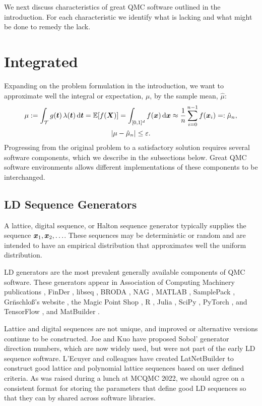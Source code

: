 \documentclass[graybox]{svmult}
\begin{document}
We next discuss characteristics of great QMC software outlined in the introduction.  For each characteristic we identify what is lacking and what might be done to remedy the lack.

\section{Integrated} \label{CDHS_sec:integrated}

Expanding on the problem formulation in the introduction, we want to approximate well the integral or expectation, $\mu$, by the sample mean, $\hat{\mu}$:
\begin{gather}
\label{eq:cubSummary}
	\mu : = \int_\calT g(\bst) \, \lambda(\bst) \, \D \bst  = \bbE[f(\bsX)] = \int_{[0,1]^d} f(\bsx)  \, \D \bsx \approx \frac 1n \sum_{i=0}^{n-1} f(\bsx_i) =: \hat{\mu}_n, \\
 \label{CDHS_eq:error_tol}
 \abs{\mu - \hat{\mu}_n} \le \varepsilon.
\end{gather}
Progressing from the original problem to a satisfactory solution requires several software components, which we describe in the subsections below.  Great QMC software environments allows different implementations of these components to be interchanged.

\subsection{LD Sequence Generators} A lattice, digital sequence, or Halton sequence generator typically supplies the sequence ${\boldsymbol{x}}_1, {\boldsymbol{x}}_2, \ldots$.  These sequences may be deterministic or random and are intended to have an empirical distribution that approximates well the uniform distribution.

LD generators are the most prevalent generally available components of QMC software.  These generators appear in Association of Computing Machinery  publications \cite{BraFox88,BraFoxNie92,HonHic00a}, FinDer \cite{PasTra95,FinDer}, libseq \cite{FriKel02,FriKelweb}, BRODA \cite{BRODA20a}, NAG \cite{NAG27}, MATLAB \cite{MAT9.13}, SamplePack \cite{SamplePack}, Gr\"nschlo{\ss}'s website \cite{GruWeb}, the Magic Point Shop \cite{NuyWeb}, R \cite{QRNG2020}, Julia \cite{QMCJulia}, SciPy \cite{virtanen2020scipy}, PyTorch \cite{paszke2019pytorch}, and TensorFlow \cite{tfqfQMC2021a}, and MatBuilder \cite{paulin2022}.

Lattice and digital sequences are not unique, and improved or alternative versions continue to be constructed.  Joe and Kuo \cite{JoeKuo03,JoeKuo08,SobolDirection} have proposed  Sobol' generator direction numbers, which are now widely used, but were not part of the early LD sequence software.  L'Ecuyer and colleagues have created LatNetBuilder \cite{LatNet} to construct good lattice and polynomial lattice sequences based on user defined criteria. As was raised during a lunch at MCQMC 2022, we should agree on a consistent format for storing the parameters that define good LD sequences so that they can by shared across software libraries.
\end{document}
